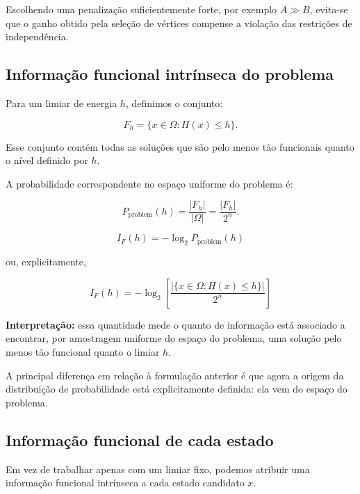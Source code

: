 \documentclass[11pt,a4paper]{article}
\begin{document}
Escolhendo uma penalização suficientemente forte, por exemplo
$A\gg B$, evita-se que o ganho obtido pela seleção de vértices
compense a violação das restrições de independência.

\subsection{Informação funcional intrínseca do problema}

Para um limiar de energia $h$, definimos o conjunto:

\[
F_h
=
\{x\in\Omega:H(x)\leq h\}.
\]

Esse conjunto contém todas as soluções que são pelo menos tão
funcionais quanto o nível definido por $h$.

A probabilidade correspondente no espaço uniforme do problema é:

\[
P_{\mathrm{problem}}(h)
=
\frac{|F_h|}{|\Omega|}
=
\frac{|F_h|}{2^n}.
\]

\begin{definitionbox}

\[
\boxed{
I_F(h)
=
-\log_2 P_{\mathrm{problem}}(h)
}
\]

ou, explicitamente,

\[
\boxed{
I_F(h)
=
-\log_2
\left[
\frac{
|\{x\in\Omega:H(x)\leq h\}|
}{
2^n
}
\right]
}
\]

\end{definitionbox}

\textbf{Interpretação:}
essa quantidade mede o quanto de informação está associado a encontrar,
por amostragem uniforme do espaço do problema, uma solução pelo menos
tão funcional quanto o limiar $h$.

A principal diferença em relação à formulação anterior é que agora
a origem da distribuição de probabilidade está explicitamente definida:
ela vem do espaço do problema.

\subsection{Informação funcional de cada estado}

Em vez de trabalhar apenas com um limiar fixo, podemos atribuir
uma informação funcional intrínseca a cada estado candidato $x$.
\end{document}
